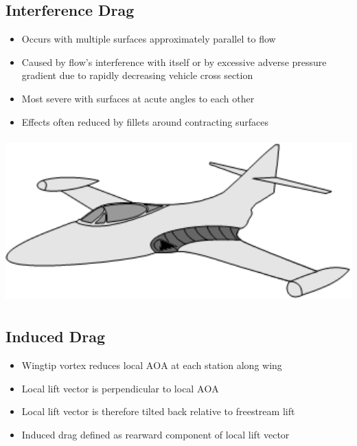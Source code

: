 \documentclass[
]{book}
\providecommand{\tightlist}{%
  \setlength{\itemsep}{0pt}\setlength{\parskip}{0pt}}
\begin{document}
\hypertarget{interference-drag}{%
\subsection{Interference Drag}\label{interference-drag}}

\begin{itemize}
\tightlist
\item
  Occurs with multiple surfaces approximately parallel to flow
\item
  Caused by flow's interference with itself or by excessive adverse pressure gradient due to rapidly decreasing vehicle cross section
\item
  Most severe with surfaces at acute angles to each other
\item
  Effects often reduced by fillets around contracting surfaces
\end{itemize}

\includegraphics[width=5.563in,height=2.5in]{media/05/image50.png}

\hypertarget{induced-drag}{%
\subsection{Induced Drag}\label{induced-drag}}

\begin{itemize}
\tightlist
\item
  Wingtip vortex reduces local \(\mathrm{AOA}\) at each station along wing
\item
  Local lift vector is perpendicular to local \(\mathrm{AOA}\)
\item
  Local lift vector is therefore tilted back relative to freestream lift
\item
  Induced drag defined as rearward component of local lift vector
\end{itemize}
\end{document}
